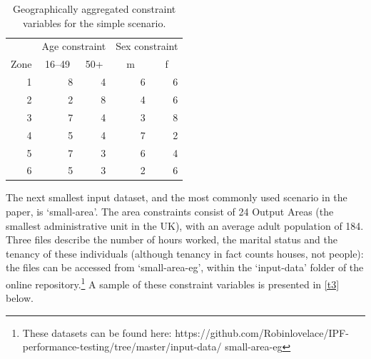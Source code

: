 \documentclass[a4paper,10pt]{article}
\begin{document}

\begin{table}[htbp]
\caption{Geographically aggregated constraint variables for the simple
scenario.}
\begin{center}
\begin{tabular}{rrrrr}
\toprule
\multicolumn{1}{l}{} & \multicolumn{2}{c}{Age constraint} & \multicolumn{2}{c}{Sex constraint} \\
\multicolumn{1}{l}{Zone} & \multicolumn{1}{c}{16--49} & \multicolumn{1}{c}{50+} & \multicolumn{1}{c}{m} & \multicolumn{1}{c}{f} \\
\midrule
1 & 8 & 4 & 6 & 6 \\
2 & 2 & 8 & 4 & 6 \\
3 & 7 & 4 & 3 & 8 \\
4 & 5 & 4 & 7 & 2 \\
5 & 7 & 3 & 6 & 4 \\
6 & 5 & 3 & 2 & 6 \\
\bottomrule
\end{tabular}
\end{center}
\label{t2}
\end{table}

The next smallest input dataset, and the most commonly used scenario in the paper, 
is `small-area'. The area constraints consist of 24 Output Areas (the smallest 
administrative unit in the UK), with an average adult population of 184.
Three files describe the number of hours worked, the marital status and the
tenancy of these 
individuals (although tenancy in fact counts houses, not people): the files can
be accessed from `small-area-eg', within the `input-data' folder of the online
repository.\footnote{These datasets can be found here:
https://github.com/Robinlovelace/IPF-performance-testing/tree/master/input-data/
small-area-eg}
A sample of these constraint variables is presented in \cref{t3} below. %
\end{document}
